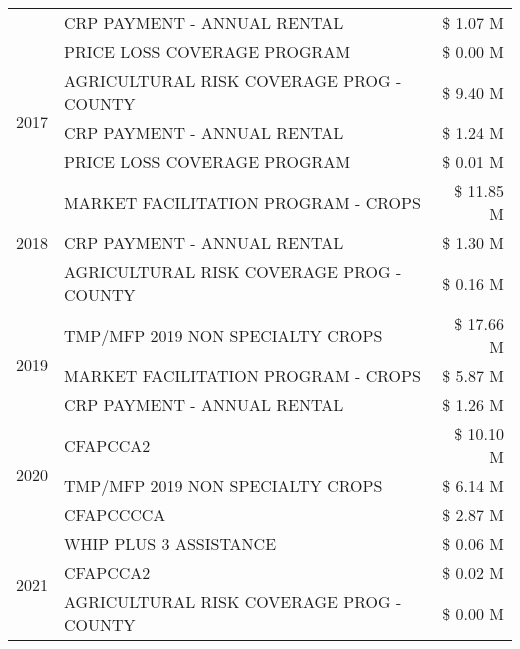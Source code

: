 \begin{tabular}{llr}
 & CRP PAYMENT - ANNUAL RENTAL                   & \$ 1.07 M \\
 & PRICE LOSS COVERAGE PROGRAM                   & \$ 0.00 M \\
\cline{1-3}
\multirow[t]{3}{*}{2017} & AGRICULTURAL RISK COVERAGE PROG - COUNTY & \$ 9.40 M \\
 & CRP PAYMENT - ANNUAL RENTAL & \$ 1.24 M \\
 & PRICE LOSS COVERAGE PROGRAM & \$ 0.01 M \\
\cline{1-3}
\multirow[t]{3}{*}{2018} & MARKET FACILITATION PROGRAM - CROPS & \$ 11.85 M \\
 & CRP PAYMENT - ANNUAL RENTAL & \$ 1.30 M \\
 & AGRICULTURAL RISK COVERAGE PROG - COUNTY & \$ 0.16 M \\
\cline{1-3}
\multirow[t]{3}{*}{2019} & TMP/MFP 2019 NON SPECIALTY CROPS & \$ 17.66 M \\
 & MARKET FACILITATION PROGRAM - CROPS & \$ 5.87 M \\
 & CRP PAYMENT - ANNUAL RENTAL & \$ 1.26 M \\
\cline{1-3}
\multirow[t]{3}{*}{2020} & CFAPCCA2 & \$ 10.10 M \\
 & TMP/MFP 2019 NON SPECIALTY CROPS & \$ 6.14 M \\
 & CFAPCCCCA & \$ 2.87 M \\
\cline{1-3}
\multirow[t]{3}{*}{2021} & WHIP PLUS 3 ASSISTANCE & \$ 0.06 M \\
 & CFAPCCA2 & \$ 0.02 M \\
 & AGRICULTURAL RISK COVERAGE PROG - COUNTY & \$ 0.00 M \\
\cline{1-3}
\bottomrule
\end{tabular}
